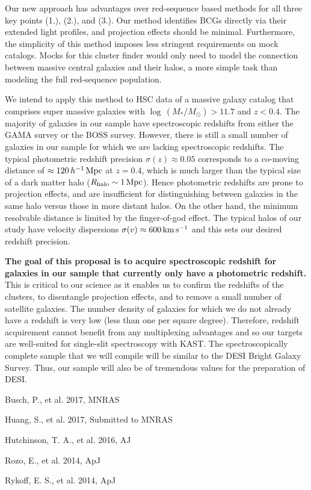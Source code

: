 \documentclass[letterpaper,12pt]{article}
\newenvironment{my_itemize}{
\begin{itemize}
  \setlength{\itemsep}{1pt}
  \setlength{\parskip}{0pt}
  \setlength{\parsep}{0pt}}{\end{itemize}
}
\begin{document}
Our new approach has advantages over red-sequence based methods for all three key points (1.), (2.), and (3.). Our
method identifies BCGs directly via their extended light profiles, and projection effects should be minimal.
Furthermore, the simplicity of this method imposes less stringent requirements on mock catalogs. Mocks for this cluster
finder would only need to model the connection between massive central galaxies and their halos, a more simple task
than modeling the full red-sequence population.

We intend to apply this method to HSC data of a massive galaxy catalog that comprises super massive galaxies with
$\log\,(M_*/M_\odot)>11.7$ and $z<0.4$. The majority of galaxies in our sample have spectroscopic redshifts from
either the GAMA survey or the BOSS survey. However, there is still a small number of galaxies in our sample for which
we are lacking spectroscopic redshifts. The typical photometric redshift precision $\sigma(z)\approx0.05$ corresponds
to a co-moving distance of $\approx120\,h^{-1}\,{\rm Mpc}$ at $z=0.4$, which is much larger than the typical size of a
dark matter halo ($R_{\rm halo}\sim1\,{\rm Mpc}$). Hence photometric redshifts are prone to projection effects, and are insufficient
for distinguishing between galaxies in the same halo versus those in more distant halos. On the other hand, the
minimum resolvable distance is limited by the finger-of-god effect. The typical halos of our study have velocity
dispersions $\sigma(v)\approx600\,{\rm km\,s^{-1}}$ and this sets our desired redshift precision.

\textbf{The goal of this proposal is to acquire spectroscopic redshift for galaxies in
our sample that currently only have a photometric redshift.} This is critical to our science as it enables
us to confirm the redshifts of the clusters, to disentangle projection effects, and to remove a small number of
satellite galaxies. The number density of galaxies for which we do not already have a redshift is very low (less than
one per square degree). Therefore, redshift acquirement cannot benefit from any multiplexing advantages and so our
targets are well-suited for single-slit spectroscopy with KAST. The spectroscopically complete sample that we will
compile will be similar to the DESI Bright Galaxy Survey. Thus, our sample will also be of tremendous values for the
preparation of DESI.

\clearpage

\vspace{-0.25in}
\begin{my_itemize}
\item Busch, P., et al. 2017, MNRAS
\item Huang, S., et al. 2017, Submitted to MNRAS
\item Hutchinson, T. A., et al. 2016, AJ
\item Rozo, E., et al. 2014, ApJ
\item Rykoff, E. S., et al. 2014, ApJ
\end{my_itemize}
\end{document}
